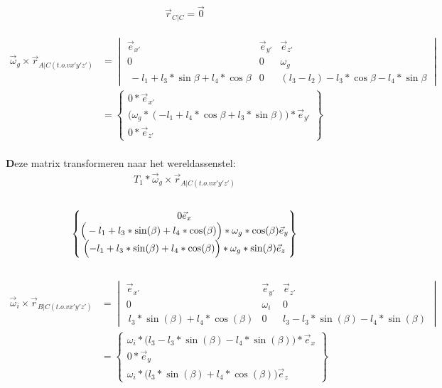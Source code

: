 \documentclass[a4paper,10pt]{article}
\begin{document}
\begin{equation}
	\vec{r}_{C|C} = \vec{0}
\end{equation}\\
\begin{equation}
	\begin{aligned}
		\vec{\omega}_g \times \vec{r}_{A|C(t.o.v x'y'z')} & = \begin{vmatrix}
			\vec{e}_{x'}& \vec{e}_{y'} & \vec{e}_{z'}\\
			0 & 0 & \omega_g \\
			\ -l_1 + l_3 * \sin{\beta} + l_4*\cos{\beta} & 0 & (l_3-l_2) - l_3 * \cos{\beta}
			- l_4 * \sin{\beta} \end{vmatrix}\\
		&= \begin{Bmatrix}
			0 *\vec{e}_{x'}\\
			\Big(\omega_g*(-l_1+l_4*\cos{\beta} + l_3 * \sin{\beta})\Big)*\vec{e}_{y'}\\
			0 * \vec{e}_{z'}
		\end{Bmatrix}
	\end{aligned}
\end{equation}\\
\textbf Deze matrix transformeren naar het wereldassenstel:\
\begin{equation}
	\begin{aligned}
		{T}_{1}* \vec{\omega}_g \times \vec{r}_{A|C(t.o.v x'y'z')}
	\end{aligned}
\end{equation}\\
\begin{equation}
	\begin{Bmatrix}
		{0\vec{e}_{x}}\\
		\Big(-l_1+l_3*\sin(\beta)+l_4*\cos(\beta)\Big)*\omega_g*\cos(\beta) \vec{e}_{y}\\
		\Big{(-l_1+l_3*\sin(\beta)+l_4*\cos(\beta)\Big)*\omega_g*\sin(\beta)\vec{e}_{z}}
	\end{Bmatrix}
\end{equation}\\
\begin{equation}
	\begin{aligned}
		\vec{\omega}_i \times \vec{r}_{B|C(t.o.v x'y'z')} & = \begin{vmatrix}
			\vec{e}_{x'}& \vec{e}_{y'} & \vec{e}_{z'}\\
			0 & \omega_i & 0 \\
			\  l_3 * \sin(\beta) + l_4 * \cos(\beta) & 0 &  l_3 -l_3*\sin(\beta) - l_4 *\sin(\beta)
		\end{vmatrix}\\
		&= \begin{Bmatrix}
			\omega_i*\Big(l_3 -l_3*\sin(\beta) - l_4 *\sin(\beta)\Big) *\vec{e}_{x}\\
			0*\vec{e}_{y}\\
			\omega_i*\Big(l_3 * \sin(\beta) + l_4 * \cos(\beta)\Big) \vec{e}_{z}
		\end{Bmatrix}
	\end{aligned}
\end{equation}\\
\end{document}
